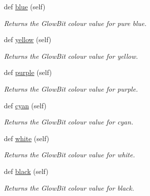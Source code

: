 \begin{DoxyCompactItemize}
\mbox{\label{classglowbit_1_1colourFunctions_afe8c58ed88b15cb68fbd22e96c6ad51b}} 
def \hyperlink{classglowbit_1_1colourFunctions_afe8c58ed88b15cb68fbd22e96c6ad51b}{blue} (self)
\begin{DoxyCompactList}\small\item\em Returns the Glow\+Bit colour value for pure blue. \end{DoxyCompactList}\item 
\mbox{\label{classglowbit_1_1colourFunctions_a41f1916e8b9f6d14262ae7e37cfa47c3}} 
def \hyperlink{classglowbit_1_1colourFunctions_a41f1916e8b9f6d14262ae7e37cfa47c3}{yellow} (self)
\begin{DoxyCompactList}\small\item\em Returns the Glow\+Bit colour value for yellow. \end{DoxyCompactList}\item 
\mbox{\label{classglowbit_1_1colourFunctions_a1c476a787a727fc9bdc835ad75926e5d}} 
def \hyperlink{classglowbit_1_1colourFunctions_a1c476a787a727fc9bdc835ad75926e5d}{purple} (self)
\begin{DoxyCompactList}\small\item\em Returns the Glow\+Bit colour value for purple. \end{DoxyCompactList}\item 
\mbox{\label{classglowbit_1_1colourFunctions_acbee8ca4dabce37aa663fbfbff2a3ae2}} 
def \hyperlink{classglowbit_1_1colourFunctions_acbee8ca4dabce37aa663fbfbff2a3ae2}{cyan} (self)
\begin{DoxyCompactList}\small\item\em Returns the Glow\+Bit colour value for cyan. \end{DoxyCompactList}\item 
\mbox{\label{classglowbit_1_1colourFunctions_a0c4d0695b48f4e17347a9924041ade59}} 
def \hyperlink{classglowbit_1_1colourFunctions_a0c4d0695b48f4e17347a9924041ade59}{white} (self)
\begin{DoxyCompactList}\small\item\em Returns the Glow\+Bit colour value for white. \end{DoxyCompactList}\item 
\mbox{\label{classglowbit_1_1colourFunctions_a3abddf433293e05d99d8c82309a08d41}} 
def \hyperlink{classglowbit_1_1colourFunctions_a3abddf433293e05d99d8c82309a08d41}{black} (self)
\begin{DoxyCompactList}\small\item\em Returns the Glow\+Bit colour value for black. \end{DoxyCompactList}\end{DoxyCompactItemize}


